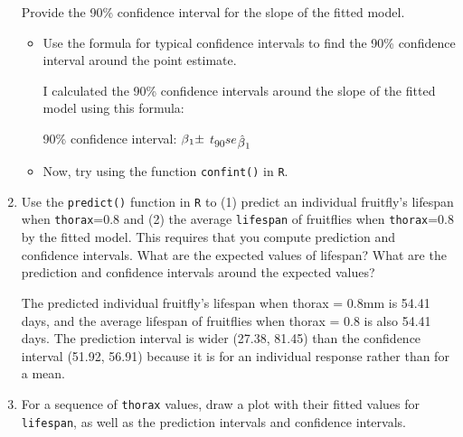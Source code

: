 \documentclass[12pt,letterpaper]{article}
\begin{document}
\begin{enumerate}
	Provide the 90\% confidence interval for the slope of the fitted model.
	 
	\begin{itemize}
		\item
		Use the formula for typical confidence intervals to find the 90\% confidence interval around the point estimate.
		
		I calculated the 90\% confidence intervals around the slope of the fitted model using this formula: 
		
		\begin{center} 90\% confidence interval: $\beta\textsubscript{1} \pm$ $t$\textsubscript{90}$se$\textsubscript{$\hat{\beta}\textsubscript{1}$}
			
		\end{center}
		
		
		\item
		Now, try using the function  \texttt{confint()}  in \texttt{R}.
				
	\end{itemize}
			\vspace{6cm}
	\item Use the \texttt{predict()} function in \texttt{R} to (1) predict an individual fruitfly's lifespan when \texttt{thorax}=0.8 and (2) the average \texttt{lifespan} of fruitflies when \texttt{thorax}=0.8 by the fitted model. This requires that you compute prediction and confidence intervals. What are the expected values of lifespan? What are the prediction and confidence intervals around the expected values? 
	
	The predicted individual fruitfly's lifespan when thorax = 0.8mm is 54.41 days, and the average lifespan of fruitflies when thorax = 0.8 is also 54.41 days. The prediction interval is wider (27.38, 81.45) than the confidence interval (51.92, 56.91) because it is for an individual response rather than for a mean.
	
		
		
	\item	For a sequence of \texttt{thorax} values, draw a plot with their fitted values for \texttt{lifespan}, as well as the prediction intervals and confidence intervals.
		

\end{enumerate}
\end{document}
